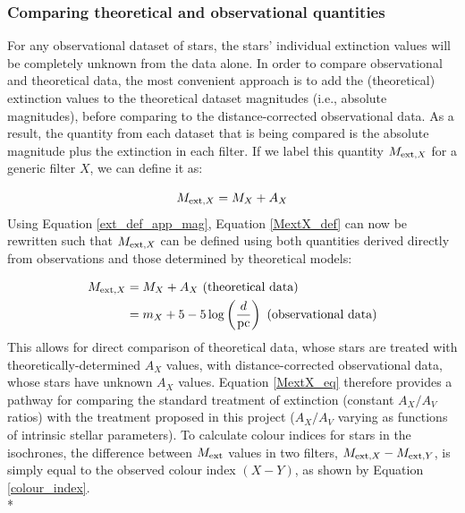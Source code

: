 \documentclass[12pt, a4paper]{report}
\begin{document}
\subsubsection{Comparing theoretical and observational quantities} \label{add_ext}
For any observational dataset of stars, the stars' individual extinction values will be completely unknown from the data alone. In order to compare observational and theoretical data, the most convenient approach is to add the (theoretical) extinction values to the theoretical dataset magnitudes (i.e., absolute magnitudes), before comparing to the distance-corrected observational data. As a result, the quantity from each dataset that is being compared is the absolute magnitude plus the extinction in each filter. If we label this quantity $M_{\textnormal{ext},X}$ for a generic filter $X$, we can define it as:

\begin{equation}
M_{\textnormal{ext},X} = M_{X} + A_{X}
\label{MextX_def}
\end{equation}
Using Equation \ref{ext_def_app_mag}, Equation \ref{MextX_def} can now be rewritten such that $M_{\textnormal{ext},X}$ can be defined using both quantities derived directly from observations and those determined by theoretical models:

\begin{align}
\begin{split}
M_{\textnormal{ext},X} &= M_{X} + A_{X} \textnormal{ (theoretical data)}\\
 &= m_{X} + 5 - 5\log\left(\frac{d}{\textnormal{pc}}\right) \textnormal{ (observational data)}
\end{split}
\label{MextX_eq}
\end{align}
This allows for direct comparison of theoretical data, whose stars are treated with theoretically-determined $A_{X}$ values, with distance-corrected observational data, whose stars have unknown $A_{X}$ values. Equation \ref{MextX_eq} therefore provides a pathway for comparing the standard treatment of extinction (constant $A_{X}/A_{V}$ ratios) with the treatment proposed in this project ($A_{X}/A_{V}$ varying as functions of intrinsic stellar parameters). To calculate colour indices for stars in the isochrones, the difference between $M_{\textnormal{ext}}$ values in two filters, $M_{\textnormal{ext},X} - M_{\textnormal{ext},Y}$, is simply equal to the observed colour index $(X-Y)$, as shown by Equation \ref{colour_index}.\\*
\end{document}
